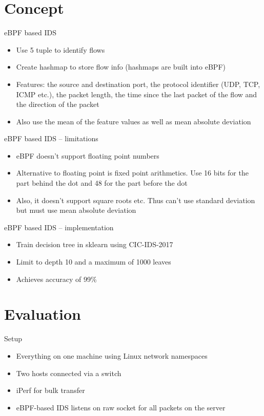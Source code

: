 \documentclass[xcolor={dvipsnames}]{beamer}
\begin{document}
\section{Concept}
\begin{frame}{eBPF based IDS}
\begin{itemize}
\item Use 5 tuple to identify flows
\item Create hashmap to store flow info (hashmaps are built into eBPF)
\item Features: the source and destination port, the protocol identifier (UDP, TCP, ICMP etc.), the packet length, the time since the last packet of the flow and the direction of the packet
\item Also use the mean of the feature values as well as mean absolute deviation
\end{itemize}
\end{frame}

\begin{frame}{eBPF based IDS -- limitations}
\begin{itemize}
\item eBPF doesn't support floating point numbers
\item Alternative to floating point is fixed point arithmetics. Use 16 bits for the part behind the dot and 48 for the part before the dot
\item Also, it doesn't support square roots etc. Thus can't use standard deviation but must use mean absolute deviation
\end{itemize}
\end{frame}

\begin{frame}{eBPF based IDS -- implementation}
\begin{itemize}
\item Train decision tree in sklearn using CIC-IDS-2017
\item Limit to depth 10 and a maximum of 1000 leaves
\item Achieves accuracy of 99\%
\end{itemize}
\end{frame}

\section{Evaluation}
\begin{frame}{Setup}
\begin{itemize}
\item Everything on one machine using Linux network namespaces
\item Two hosts connected via a switch
\item iPerf for bulk transfer
\item eBPF-based IDS listens on raw socket for all packets on the server 
\end{itemize}
\end{frame}
\end{document}
